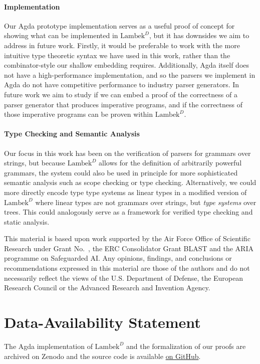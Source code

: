 \documentclass[acmsmall,nonacm]{acmart}
\newcommand{\theoryabbv}{$\textrm{Lambek}^D$\xspace}
\begin{document}
\paragraph{Implementation}

Our Agda prototype implementation serves as a useful proof of concept
for showing what can be implemented in \theoryabbv, but it has
downsides we aim to address in future work. Firstly, it would be
preferable to work with the more intuitive type theoretic syntax we
have used in this work, rather than the combinator-style our shallow
embedding requires. Additionally, Agda itself does not have a
high-performance implementation, and so the parsers we implement in
Agda do not have competitive performance to industry parser
generators. In future work we aim to study if we can embed a proof of
the correctness of a parser generator that produces imperative
programs, and if the correctness of those imperative
programs can be proven within \theoryabbv.

\paragraph{Type Checking and Semantic Analysis}
Our focus in this work has been on the verification of parsers for
grammars over strings, but because \theoryabbv allows for the
definition of arbitrarily powerful grammars, the system could also be
used in principle for more sophisticated semantic analysis such as
scope checking or type checking. Alternatively, we could more directly
encode type type systems as linear types in a modified version of
\theoryabbv where linear types are not grammars over strings, but
\emph{type systems} over trees. This could analogously serve as a
framework for verified type checking and static analysis.

\newpage

\begin{acks}
  This material is based upon work supported by the Air Force Office of
  Scientific Research under Grant No.~, the ERC
  Consolidator Grant BLAST and the ARIA programme on Safeguarded AI. Any
  opinions, findings, and conclusions or recommendations expressed in this
  material are those of the authors and do not necessarily reflect the views of
  the U.S. Department of Defense, the European Research Council or the Advanced
  Research and Invention Agency.
\end{acks}

\section*{Data-Availability Statement}
The Agda implementation of \theoryabbv and the formalization of our proofs are archived on Zenodo \cite{schaefer_2025_15243560} and the source code is available \href{https://github.com/maxsnew/grammars-and-semantic-actions/tree/PLDI25Artifact}{on GitHub}.
\end{document}
